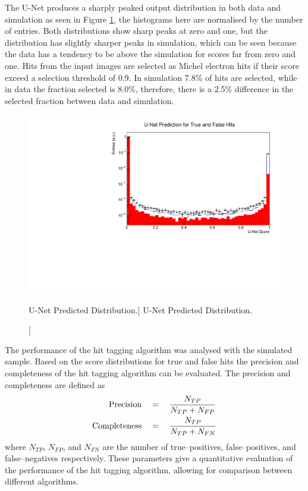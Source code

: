 The U-Net produces a sharply peaked output distribution in both data and
simulation as seen in Figure \ref{fig:unet_pred_data}, the histograms here are
normalised by the number of entries. Both distributions show sharp peaks at zero
and one, but the distribution has slightly sharper peaks in simulation, which 
can be seen because the data has a tendency to be above the simulation for
scores far from zero and one. Hits from the input images are selected as 
Michel electron hits if their score exceed a selection threshold of 0.9. In 
simulation 7.8\% of hits are selected, while in data the fraction selected is 
8.0\%, therefore, there is a 2.5\% difference in the selected fraction between 
data and simulation.  
\begin{figure}
	\centering
	\includegraphics[width=\textwidth]{figures/unet_pred_data.pdf}
	\caption
	[U-Net Predicted Distribution.]
	{U-Net Predicted Distribution.}
	\label{fig:unet_pred_data}
\end{figure}

The performance of the hit tagging algorithm was analysed with the simulated
sample. Based on the score distributions for true and false hits the precision 
and completeness of the hit tagging algorithm can be evaluated. The precision 
and completeness are defined as 
\begin{align}
	\mbox{Precision} \quad &= \quad  \frac{N_{TP}}{N_{TP} + N_{FP}} \\
	\vspace{2mm}
	\mbox{Completeness} \quad &= \quad \frac{N_{TP}}{N_{TP} + N_{FN}}
\end{align}
where $N_{TP}$, $N_{FP}$, and $N_{FN}$ are the number of true--positives,
false--positives, and false--negatives respectively. These parameters give a
quantitative evaluation of the performance of the hit tagging algorithm,
allowing for comparison between different algorithms. 

